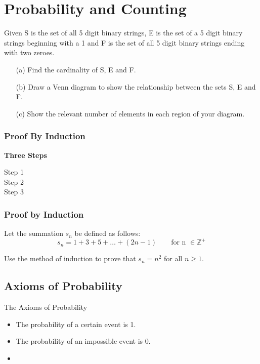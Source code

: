 \documentclass[]{report}
\begin{document}
\section{Probability and Counting}

Given S is the set of all 5 digit binary strings, E is the set of a 5 digit
binary strings beginning with a 1 and F is the set of all 5 digit binary strings ending
with two zeroes.
\begin{itemize}
\item[(a)] Find the cardinality of S, E and F.
\item[(b)] Draw a Venn diagram to show the relationship between the sets S, E and F.
\item[(c)]Show the relevant number of elements in each region of your diagram.
\end{itemize}
\newpage


\begin{frame}
\frametitle{Proof By Induction}
\Large
\textbf{Three Steps}
\begin{description}
\item[Step 1]
\item[Step 2]
\item[Step 3]
\end{description}

\end{frame}
\begin{frame}
\frametitle{Proof by Induction}
\Large
Let the summation $s_n$ be defined as follows:
\[s_n = 1 + 3 + 5 + \ldots + (2n - 1) \qquad \mbox{for n }\in \mathbb{Z}^{+}\]

Use the method of induction to prove that $s_n = n^2$ for all $n \geq 1$.
\end{frame}



\subsection{Axioms of Probability}

The Axioms of Probability

\begin{itemize}
\item The probability of a certain event is 1.
\item The probability of an impossible event is 0.
\item 
\end{itemize}
\end{document}
